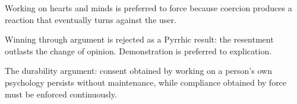 

\begin{distilled}
  \item Working on hearts and minds is preferred to force because coercion produces a reaction that eventually turns against the user.
  \item Winning through argument is rejected as a Pyrrhic result: the resentment outlasts the change of opinion. Demonstration is preferred to explication.
\end{distilled}

\begin{unique}
  \item The durability argument: consent obtained by working on a person's own psychology persists without maintenance, while compliance obtained by force must be enforced continuously.
\end{unique}
